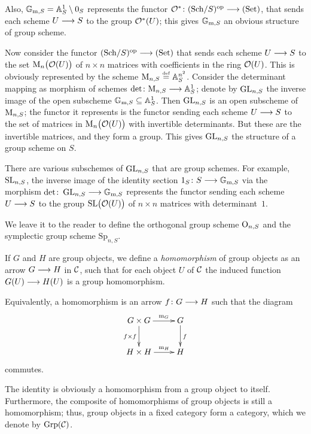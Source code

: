 \begin{2   CONTRAVARIANT FUNCTORS}
\begin{2.2 Group objects}
Also, $\mathbb{G}_{\mathrm{m}, S} = \mathbb{A}_S^1 \setminus 0_S$ represents the functor $\cO^*\colon \catsch{S}\op \arr \catset$, that sends each scheme $U \arr S$ to the group $\mathcal{O}^*(U)$; this gives $\mathbb{G}_{\mathrm{m}, S}$ an obvious structure of group scheme.

Now consider the functor $\catsch{S}\op \arr \catset$ that sends each scheme $U \arr S$ to the set $\mathrm{M}_n\bigl(\mathcal{O}(U)\bigr)$ of $n \times n$ matrices with coefficients in the ring $\mathcal{O}(U)$. This is obviously represented by the scheme $\mathrm{M}_{n,S} \overset{\mathrm{\scriptscriptstyle def}} = \mathbb{A}_S^{n^2}$. Consider the determinant mapping as morphism of schemes $\det \colon \M_{n,S} \arr \AA_S^1$; denote by $\operatorname{GL}_{n,S}$ the inverse image of the open subscheme $\mathbb{G}_{\mathrm{m}, S} \subseteq \mathbb{A}_{S}^1$. Then $\operatorname{GL}_{n,S}$ is an open subscheme of $\mathrm{M}_{n,S}$; the functor it represents is the functor sending each scheme $U \arr S$ to the set of matrices in $\mathrm{M}_n\bigl(\mathcal{O}(U)\bigr)$ with invertible determinants. But these are the invertible matrices, and they form a group. This gives $\operatorname{GL}_{n,S}$ the structure of a group scheme on $S$.

There are various subschemes of $\operatorname{GL}_{n,S}$ that are group schemes. For example, $\operatorname{SL}_{n,S}$, the inverse image of the identity section $1_S \colon S \arr \gm$ via the morphism $\det \colon \GL_{n,S} \arr \gm$ represents the functor sending each scheme $U \arr S$ to the group $\operatorname{SL} \bigl(\mathcal{O}(U)\bigr)$ of $n \times n$ matrices with determinant~$1$.

We leave it to the reader to define the orthogonal group scheme $\mathrm{O}_{n,S}$ and the symplectic group scheme $\mathrm{Sp}_{n,S}$.

\begin{definition}
If $G$ and $H$ are group objects, we define a \emph{homomorphism} of group objects as an arrow $G \arr H$ in $\mathcal{C}$, such that for each object $U$ of $\mathcal{C}$ the induced function $G(U) \arr H(U)$ is a group homomorphism.

Equivalently, a homomorphism is an arrow $f \colon G \arr H$ such that the diagram
   \[
   \xymatrix{
   G \times G \ar[r]^-{\mul_G} \ar[d]_{f \times f} & G\ar[d]^f\\
   H \times H \ar[r]^-{\mul_H}                     & H
   }
   \]
commutes.
\end{definition}


The identity is obviously a homomorphism from a group object to itself. Furthermore, the composite of homomorphisms of group objects is still a homomorphism; thus, group objects in a fixed category form a category, which we denote by $\mathrm{Grp}(\mathcal{C})$.



\end{2.2 Group objects}
\end{2   CONTRAVARIANT FUNCTORS}
